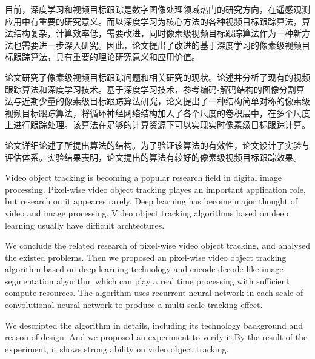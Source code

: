 
\begin{cabstract}
	目前，深度学习和视频目标跟踪是数字图像处理领域热门的研究方向，在遥感观测应用中有重要的研究意义。而以深度学习为核心方法的各种视频目标跟踪算法，算法结构复杂，计算效率低，需要改进，同时像素级视频目标跟踪算法作为一种新方法也需要进一步深入研究。因此，论文提出了改进的基于深度学习的像素级视频目标跟踪算法，具有重要的理论研究意义和应用价值。
	\par
	论文研究了像素级视频目标跟踪问题和相关研究的现状。论述并分析了现有的视频跟踪算法和深度学习技术。基于深度学习技术，参考编码-解码结构的图像分割算法与近期少量的像素级目标跟踪算法研究，论文提出了一种结构简单对称的像素级视频目标跟踪算法，将循环神经网络结构加入了各个尺度的卷积层中，在多个尺度上进行跟踪处理。该算法在足够的计算资源下可以实现实时像素级目标跟踪计算。
	\par
	论文详细论述了所提出算法的结构。为了验证该算法的有效性，论文设计了实验与评估体系。实验结果表明，论文提出的算法有较好的像素级视频目标跟踪效果。
\end{cabstract}

\begin{eabstract}
	Video object tracking is becoming a popular research field in digital image processing. Pixel-wise video object tracking playes an important application role, but research on it appeares rarely. Deep learning has become major thought of video and image processing. Video object tracking algorithms based on deep learning usually have difficult archtectures. 
	\par
	We conclude the related research of pixel-wise video object tracking, and analysed the existed problems. Then we proposed an pixel-wise video object tracking algorithm based on deep learning technology and encode-decode like image segmentation algorithm which can play a real time processing with sufficient compute resources. The algorithm uses recurrent neural network in each scale of convolutional neural network to produce a multi-scale tracking effect.
	\par
	We descripted the algorithm in details, including its technology background and reason of design. And we proposed an experiment to verify it.By the result of the experiment, it shows strong ability on video object tracking.
\end{eabstract}

